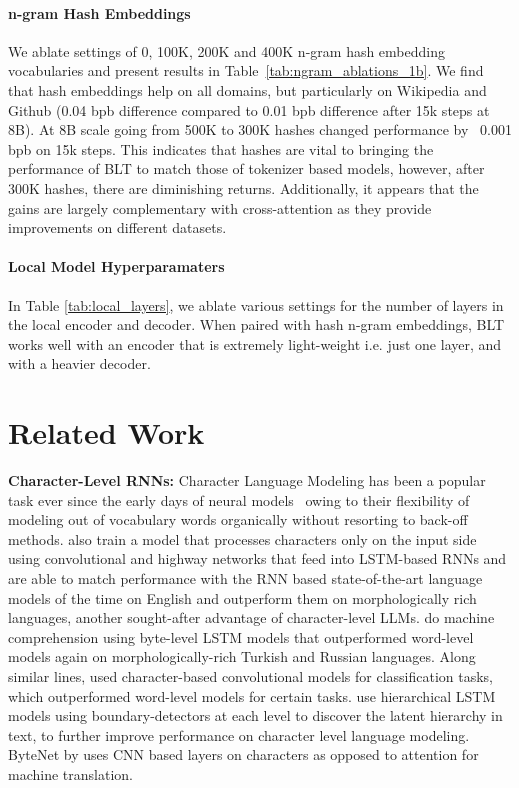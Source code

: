 \paragraph{n-gram Hash Embeddings} 

We ablate settings of 0, 100K, 200K and 400K n-gram hash embedding vocabularies and present results in Table~\ref{tab:ngram_ablations_1b}. We find that hash embeddings help on all domains, but particularly on Wikipedia and Github (0.04 bpb difference compared to 0.01 bpb difference after 15k steps at 8B). At 8B scale going from 500K to 300K hashes changed performance by ~0.001 bpb on 15k steps. This indicates that hashes are vital to bringing the performance of {\textsc BLT} to match those of tokenizer based models, however, after 300K hashes, there are diminishing returns. Additionally, it appears that the gains are largely complementary with cross-attention as they provide improvements on different datasets.

\paragraph{Local Model Hyperparamaters} In Table \ref{tab:local_layers}, we ablate various settings for the number of layers in the local encoder and decoder. When paired with hash n-gram embeddings, {\textsc BLT} works well with an encoder that is extremely light-weight i.e. just one layer, and with a heavier decoder.

\section{Related Work}
\label{section:related_work}

\textbf{Character-Level RNNs:} Character Language Modeling has been a popular task ever since the early days of neural models~\citep{sutskever2011generating,mikolov2012subword,graves2013generating} owing to their flexibility of modeling out of vocabulary words organically without resorting to back-off methods. \cite{kim2016character} also train a model that processes characters only on the input side using convolutional and highway networks that feed into LSTM-based RNNs and are able to match performance with the RNN based state-of-the-art language models of the time on English and outperform them on morphologically rich languages, another sought-after advantage of character-level LLMs. \cite{kenter2018byte} do machine comprehension using byte-level LSTM models that outperformed word-level models again on morphologically-rich Turkish and Russian languages. Along similar lines, \cite{zhang2015character} used character-based convolutional models for classification tasks, which outperformed word-level models for certain tasks. \citet{chung2019hierarchical} use hierarchical LSTM models using boundary-detectors at each level to discover the latent hierarchy in text, to further improve performance on character level language modeling. ByteNet by \cite{kalchbrenner2016neural} uses CNN based layers on characters as opposed to attention for machine translation. 

